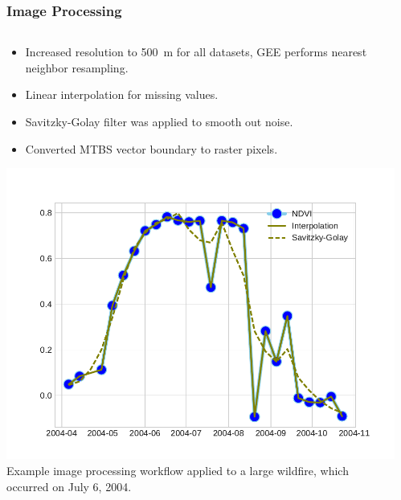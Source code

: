 \documentclass{beamer}
\begin{document}
\begin{frame}
  \frametitle{Image Processing}
\begin{columns}[T]
    \begin{column}{.5\textwidth}
    
  \centering
  \scriptsize 
\vspace{-0.2cm}
\begin{itemize}
 \item Increased resolution to 500~m for all datasets, GEE performs nearest neighbor resampling. 
 \item Linear interpolation for missing values.  
 \item Savitzky-Golay filter was applied to smooth out noise.
 \item Converted MTBS vector boundary to raster pixels. 
\end{itemize}
\vspace{-0.2cm}
   \includegraphics[width=1.0\textwidth]{figs/dallcity2004_fire}
\\ 
\tiny 
Example image processing workflow applied to a large wildfire, which occurred on July 6, 2004.
    \end{column}
    \begin{column}{.5\textwidth}
\vspace{-0.2cm}

\end{column}
\end{columns}
\end{frame}
\end{document}
